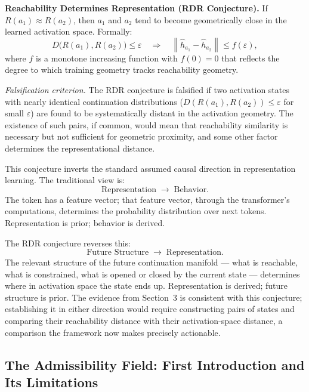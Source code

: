 \documentclass[12pt, a4paper]{article}
\theoremstyle{plain}
\theoremstyle{definition}
\theoremstyle{remark}
\newcommand{\norm}[1]{\left\|#1\right\|}
\newcommand{\hh}{\hat{h}}
\newcommand{\Ra}{\Rightarrow}
\newcommand{\lra}{\longrightarrow}
\newcommand{\reachset}[1]{R(#1)}
\begin{document}
\begin{principleBox}
\textbf{Reachability Determines Representation (RDR Conjecture).}
If $\reachset{a_1} \approx \reachset{a_2}$, then $a_1$ and $a_2$ tend to
become geometrically close in the learned activation space. Formally:
\begin{equation}
  D\bigl(\reachset{a_1}, \reachset{a_2}\bigr) \leq \varepsilon
  \quad\Ra\quad
  \norm{\hh_{a_1} - \hh_{a_2}} \leq f(\varepsilon),
\end{equation}
where $f$ is a monotone increasing function with $f(0) = 0$ that reflects the
degree to which training geometry tracks reachability geometry.

\emph{Falsification criterion.} The RDR conjecture is falsified if two
activation states with nearly identical continuation distributions
($D(\reachset{a_1}, \reachset{a_2}) \leq \varepsilon$ for small $\varepsilon$)
are found to be systematically distant in the activation geometry. The
existence of such pairs, if common, would mean that reachability similarity
is necessary but not sufficient for geometric proximity, and some other factor
determines the representational distance.
\end{principleBox}

This conjecture inverts the standard assumed causal direction in representation
learning. The traditional view is:
\begin{equation}
  \text{Representation} \;\lra\; \text{Behavior}.
\end{equation}
The token has a feature vector; that feature vector, through the transformer's
computations, determines the probability distribution over next tokens.
Representation is prior; behavior is derived.

The RDR conjecture reverses this:
\begin{equation}
  \text{Future Structure} \;\lra\; \text{Representation}.
\end{equation}
The relevant structure of the future continuation manifold --- what is
reachable, what is constrained, what is opened or closed by the current state ---
determines where in activation space the state ends up. Representation is
derived; future structure is prior. The evidence from Section~3 is consistent
with this conjecture; establishing it in either direction would require
constructing pairs of states and comparing their reachability distance with
their activation-space distance, a comparison the framework now makes
precisely actionable.

\subsection{The Admissibility Field: First Introduction and Its Limitations}
\end{document}
